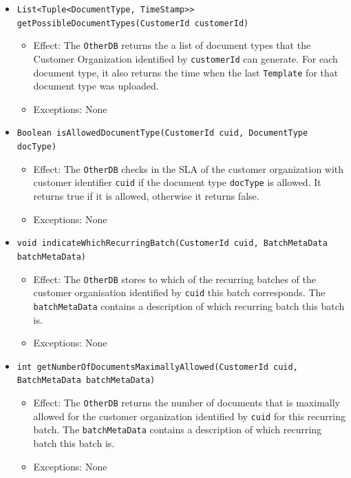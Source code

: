 \documentclass[a4paper,10pt]{article}
\begin{document}
\begin{itemize}
\begin{itemize}
		\item \texttt{List<Tuple<DocumentType, TimeStamp>> getPossibleDocumentTypes(CustomerId customerId)}
		\begin{itemize}
            \item Effect: The \texttt{OtherDB} returns the a list of document types that the Customer Organization identified by \texttt{customerId} can generate. For each document type, it also returns the time when the last \texttt{Template} for that document type was uploaded.  
            \item Exceptions: None
        \end{itemize} 
        
		\item \texttt{Boolean isAllowedDocumentType(CustomerId cuid, DocumentType docType)}        
		\begin{itemize}
			\item Effect: The \texttt{OtherDB} checks in the SLA of the customer organization with customer identifier \texttt{cuid} if the document type \texttt{docType} is allowed. It returns true if it is allowed, otherwise it returns false.
			\item Exceptions: None
		\end{itemize}		        
        
        	\item \texttt{void indicateWhichRecurringBatch(CustomerId cuid, BatchMetaData batchMetaData) }        
		\begin{itemize}
			\item Effect: The \texttt{OtherDB} stores to which of the recurring batches of the customer organisation identified by \texttt{cuid} this batch corresponds. The \texttt{batchMetaData} contains a description of which recurring batch this batch is.
			\item Exceptions: None
		\end{itemize}	
     
           \item \texttt{int getNumberOfDocumentsMaximallyAllowed(CustomerId cuid, BatchMetaData batchMetaData) }        
		\begin{itemize}
			\item Effect: The \texttt{OtherDB} returns the number of documents that is maximally allowed for the customer organization identified by \texttt{cuid} for this recurring batch. The \texttt{batchMetaData} contains a description of which recurring batch this batch is.
			\item Exceptions: None
		\end{itemize}     
    \end{itemize}
    

\end{itemize}
\end{document}
